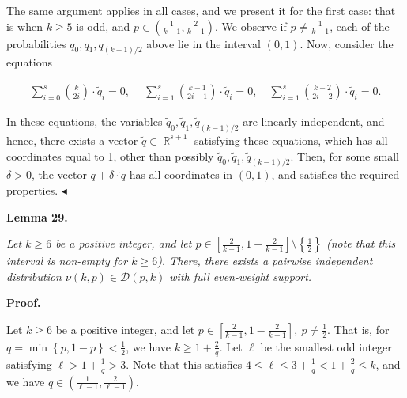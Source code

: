 \documentclass[10pt,a4paper]{article}
\begin{document}
The same argument applies in all cases, and we present it for the first case: that is when $k\geqslant 5$ is odd, and $p\in\left(\frac{1}{k-1},\frac{2}{k-1}\right)$.
We observe if $p\not=\frac{1}{k-1}$, each of the probabilities $q_{0},q_{1},q_{(k-1)/2}$ above lie in the interval $(0,1)$.
Now, consider the equations\par


\[\begin{gathered}
\sum_{i=0}^{s}\binom{k}{2i}\cdot\tilde{q}_{i}=0,\ \quad\sum_{i=1}^{s}\binom{k-1}{2i-1}\cdot\tilde{q}_{i}=0,\quad\sum_{i=1}^{s}\binom{k-2}{2i-2}\cdot\tilde{q}_{i}=0.
\end{gathered}\]


In these equations, the variables $\tilde{q}_{0},\tilde{q}_{1},\tilde{q}_{(k-1)/2}$ are linearly independent, and hence, there exists a vector $\tilde{q}\in\mathop{\mathbb{R}}^{s+1}$ satisfying these equations, which has all coordinates equal to 1, other than possibly $\tilde{q}_{0},\tilde{q}_{1},\tilde{q}_{(k-1)/2}$.
Then, for some small $\delta>0$, the vector $q+\delta\cdot\tilde{q}$ has all coordinates in $(0,1)$, and satisfies the required properties. $\blacktriangleleft$\par





\par\medskip\noindent\textbf{
\textbf{Lemma 29}\textbf{.}
}\par



\emph{Let $k\geqslant 6$ be a positive integer, and let $p\in\left[\frac{2}{k-1},1-\frac{2}{k-1}\right]\setminus\left\{\frac{1}{2}\right\}$ (note that this interval is non-empty for $k\geqslant 6$).
There, there exists a pairwise independent distribution $\nu(k,p)\in\mathcal{D}(p,k)$ with full even-weight support.}\par







\par\medskip\noindent\textbf{Proof.}\par




Let $k\geqslant 6$ be a positive integer, and let $p\in\left[\frac{2}{k-1},1-\frac{2}{k-1}\right],\ p\not=\frac{1}{2}$.
That is, for $q=\min\left\{p,1-p\right\}<\frac{1}{2}$, we have $k\geqslant 1+\frac{2}{q}$.
Let $\ell$ be the smallest odd integer satisfying $\ell>1+\frac{1}{q}>3$.
Note that this satisfies $4\leqslant\ell\leqslant 3+\frac{1}{q}<1+\frac{2}{q}\leqslant k$, and we have $q\in\left(\frac{1}{\ell-1},\frac{2}{\ell-1}\right)$.\par
\end{document}
